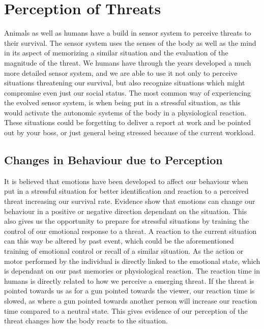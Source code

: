 \section{Perception of Threats} \label{perception}
Animals as well as humans have a build in sensor system to perceive threats to their survival. The sensor system uses the senses of the body as well as the mind in its aspect of memorizing a similar situation and the evaluation of the magnitude of the threat. We humans have through the years developed a much more detailed sensor system, and we are able to use it not only to perceive situations threatening our survival, but also recognize situations which might compromise even just our social status. The most common way of experiencing the evolved sensor system, is when being put in a stressful situation, as this would activate the autonomic systems of the body in a physiological reaction. These situations could be forgetting to deliver a report at work and be pointed out by your boss, or just general being stressed because of the current workload.

\subsection{Changes in Behaviour due to Perception}
It is believed that emotions have been developed to affect our behaviour when put in a stressful situation for better identification and reaction to a perceived threat increasing our survival rate. Evidence show that emotions can change our behaviour in a positive or negative direction dependant on the situation. This also gives us the opportunity to prepare for stressful situations by training the control of our emotional response to a threat. A reaction to the current situation can this way be altered by past event, which could be the aforementioned training of emotional control or recall of a similar situation. As the action or motor performed by the individual is directly linked to the emotional state, which is dependant on our past memories or physiological reaction. The reaction time in humans is directly related to how we perceive a emerging threat. If the threat is pointed towards us as for a gun pointed towards the viewer, our reaction time is slowed, as where a gun pointed towards another person will increase our reaction time compared to a neutral state. This gives evidence of our perception of the threat changes how the body reacts to the situation. 
\cite{threat_behaviour}

